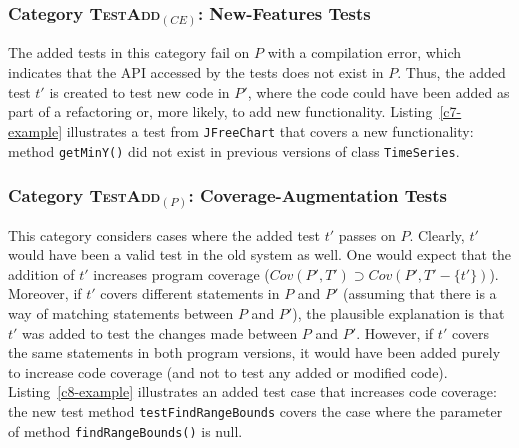 \documentclass[conference]{IEEEtran}
\newcommand{\lang}[1]{\texttt{\small #1}}
\newcommand{\subject}[1]{\texttt{\small #1}}
\newcommand{\mt}{\mathit}
\newcommand{\covfunc}[2]{\mt{Cov(#1, #2)}}
\newcommand{\cataddce}{\textsc{TestAdd}$_\mt{(CE)}$}
\newcommand{\cataddp}{\textsc{TestAdd}$_\mt{(P)}$}
\begin{document}


\subsubsection{Category \cataddce: New-Features Tests}
\label{sec:category-addce}

The added tests in this category fail on $P$ with a compilation error,
which indicates that the API accessed by the tests does not exist in
$P$. Thus, the added test $t'$ is created to test new code in $P'$,
where the code could have been added as part of a refactoring or, more
likely, to add new functionality.  Listing~\ref{c7-example}
illustrates a test from \subject{JFreeChart} that covers a new
functionality: method \lang{getMinY()} did not exist in previous
versions of class \lang{TimeSeries}.



\subsubsection{Category \cataddp: Coverage-Augmentation Tests}
\label{sec:category-addp}

This category considers cases where the added test $t'$ passes on
$P$. Clearly, $t'$ would have been a valid test in the old system as
well. One would expect that the addition of $t'$ increases program
coverage (\ie $\covfunc{P'}{T'} \supset \covfunc{P'}{T' -
  \{t'\}}$). Moreover, if $t'$ covers different statements in $P$ and
$P'$ (assuming that there is a way of matching statements between $P$
and $P'$), the plausible explanation is that $t'$ was added to test
the changes made between $P$ and $P'$. However, if $t'$ covers the
same statements in both program versions, it would have been added
purely to increase code coverage (and not to test any added or
modified code).  Listing~\ref{c8-example} illustrates an added test
case that increases code coverage: the new test method
\lang{testFindRangeBounds} covers the case where the parameter of
method \lang{findRangeBounds()} is null.
\end{document}
